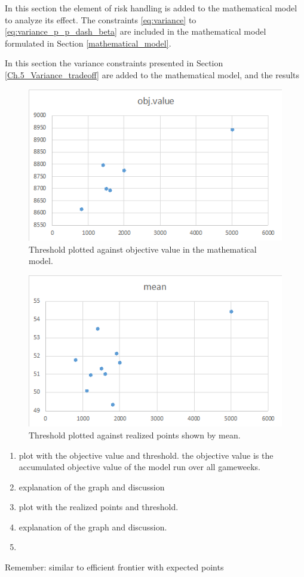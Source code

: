 In this section the element of risk handling is added to the mathematical model to analyze its effect. The constraints \ref{eq:variance} to \ref{eq:variance_p_p_dash_beta} are included in the mathematical model formulated in Section \ref{mathematical_model}.

In this section the variance constraints presented in Section \ref{Ch.5_Variance_tradeoff} are added to the mathematical model, and the results 

\begin{figure}[H]
    \centering
    \includegraphics[scale=0.75]{fig/chapter_7/threshold_obj_value.png}
    \caption{Threshold plotted against objective value in the mathematical model.}
\label{fig: threshold_obj_value}    
\end{figure}

\begin{figure}[H]
    \centering
    \includegraphics[scale=0.75]{fig/chapter_7/threshold_mean.png}
    \caption{Threshold plotted against realized points shown by mean.}
\label{fig: threshold_obj_value}    
\end{figure}

\begin{enumerate}
    \item plot with the objective value and threshold. the objective value is the accumulated objective value of the model run over all gameweeks. 
    \item explanation of the graph and discussion 
    \item plot with the realized points and threshold. 
    \item explanation of the graph and discussion. 
    \item 
\end{enumerate}
Remember: similar to efficient frontier with expected points